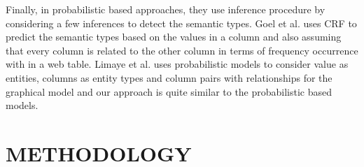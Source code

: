 \documentclass[12pt, a4paper]{report}
\theoremstyle{definition}
\numberwithin{equation}{chapter}
\numberwithin{figure}{chapter}
\numberwithin{table}{chapter}
\begin{document}
\begin{spacing}{1.5}
\par
\setlength{\parskip}{2.2em}
\setlength{\parindent}{0em}
Finally, in probabilistic based approaches, they use inference procedure by considering a few inferences to detect the semantic types. Goel et al. \cite{11} uses CRF to predict the semantic types based on the values in a column and also assuming that every column is related to the other column in terms of frequency occurrence with in a web table. Limaye et al. \cite{19} uses probabilistic models to consider value as entities, columns as entity types and column pairs with relationships for the graphical model and our approach is quite similar to the probabilistic based models.
\end{spacing}


\chapter{METHODOLOGY}
\end{document}

